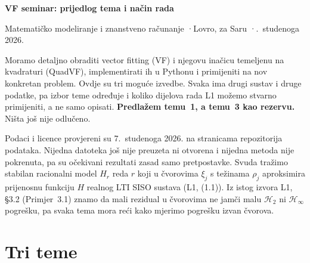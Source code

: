 \documentclass[10pt,a4paper]{article}
\newcommand{\Htwo}{\mathcal{H}_2}
\newcommand{\Hinf}{\mathcal{H}_\infty}
\begin{document}
{\sffamily\LARGE\bfseries\color{accent} VF seminar: prijedlog tema i način rada\par}
\vspace{0.3em}
{\small\color{muted} Matematičko modeliranje i znanstveno računanje \quad·\quad Lovro, za Saru \quad·.~studenoga 2026.\par}
\vspace{0.6em}

Moramo detaljno obraditi vector fitting (VF) i njegovu inačicu temeljenu na kvadraturi (QuadVF),
implementirati ih u Pythonu i primijeniti na nov konkretan problem. Ovdje su tri moguće izvedbe.
Svaka ima drugi sustav i druge podatke, pa izbor teme određuje i koliko dijelova rada L1 možemo
stvarno primijeniti, a ne samo opisati. \textbf{Predlažem temu~1, a temu~3 kao rezervu.} Ništa još
nije odlučeno.

Podaci i licence provjereni su 7.~studenoga 2026. na stranicama repozitorija podataka. Nijedna
datoteka još nije preuzeta ni otvorena i nijedna metoda nije pokrenuta, pa su očekivani rezultati
zasad samo pretpostavke. Svuda tražimo stabilan racionalni model $H_r$ reda $r$ koji u čvorovima
$\xi_j$ s težinama $\rho_j$ aproksimira prijenosnu funkciju $H$ realnog LTI SISO sustava
(L1, (1.1)). Iz istog izvora L1, §3.2 (Primjer~3.1) znamo da mali rezidual u čvorovima ne jamči
malu $\Htwo$ ni $\Hinf$ pogrešku, pa svaka tema mora reći kako mjerimo pogrešku izvan čvorova.

\section{Tri teme}
\end{document}
